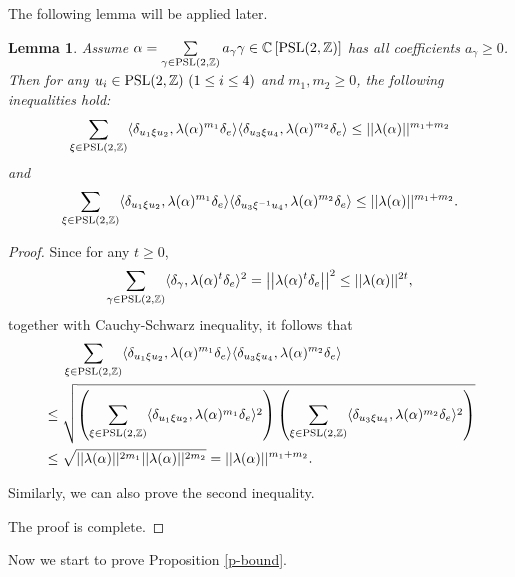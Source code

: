 \documentclass{amsart}
\theoremstyle{plain}
\newtheorem{lemma}[theorem]{Lemma}
\theoremstyle{definition}
\theoremstyle{remark}
\begin{document}
    The following lemma will be applied later.
    \begin{lemma}\label{l-sc}
       Assume $\alpha=\sum\limits_{\gamma\in\textnormal{PSL}(2,\mathbb{Z})}a_{\gamma}\gamma\in\mathbb{C}\left[\textnormal{PSL}(2,\mathbb{Z})\right]$ has all coefficients $a_\gamma\geq 0$. Then for any $u_i\in\textnormal{PSL}(2,\mathbb{Z})\ (1\leq i\leq 4)$ and $m_1,m_2\geq 0$, the following inequalities hold:
     $$\sum\limits_{\xi\in\textnormal{PSL}(2,\mathbb{Z})}\langle\delta_{u_1\xi u_2},\lambda(\alpha)^{m_1}\delta_e\rangle\langle\delta_{u_3\xi u_4},\lambda(\alpha)^{m_2}\delta_e\rangle\leq ||\lambda(\alpha)||^{m_1+m_2}$$
     and
     $$\sum\limits_{\xi\in\textnormal{PSL}(2,\mathbb{Z})}\langle\delta_{u_1\xi u_2},\lambda(\alpha)^{m_1}\delta_e\rangle\langle\delta_{u_3\xi^{-1}u_4},\lambda(\alpha)^{m_2}\delta_e\rangle\leq ||\lambda(\alpha)||^{m_1+m_2}.$$
    \end{lemma}
    \begin{proof}
        Since for any $t\geq 0$,
        $$\sum\limits_{\gamma\in\textnormal{PSL}(2,\mathbb{Z})}\langle \delta_\gamma,\lambda(\alpha)^t\delta_e\rangle^2=\left|\left|\lambda(\alpha)^t\delta_e\right|\right|^2\leq ||\lambda(\alpha)||^{2t},$$
        together with Cauchy-Schwarz inequality, it follows that
        \begin{align*}
            &\ \ \ \ \sum\limits_{\xi\in\textnormal{PSL}(2,\mathbb{Z})}\langle\delta_{u_1\xi u_2},\lambda(\alpha)^{m_1}\delta_e\rangle\langle\delta_{u_3\xi u_4},\lambda(\alpha)^{m_2}\delta_e\rangle\\
            &\leq\sqrt{\left(\sum\limits_{\xi\in\textnormal{PSL}(2,\mathbb{Z})}\langle\delta_{u_1\xi u_2},\lambda(\alpha)^{m_1}\delta_e\rangle^2\right)\left(\sum\limits_{\xi\in\textnormal{PSL}(2,\mathbb{Z})}\langle\delta_{u_3\xi u_4},\lambda(\alpha)^{m_2}\delta_e\rangle^2\right)}\\
     &\leq\sqrt{||\lambda(\alpha)||^{2m_1}||\lambda(\alpha)||^{2m_2}}=||\lambda(\alpha)||^{m_1+m_2}.
        \end{align*}
        
        Similarly, we can also prove the second inequality.

        The proof is complete.
    \end{proof}
    
    Now we start to prove Proposition \ref{p-bound}.
   
\end{document}
